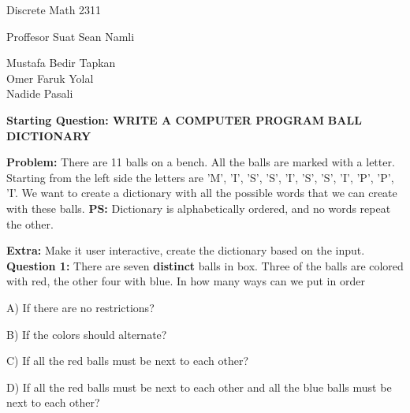 \documentclass[11pt]{article}
\begin{document}
\begin{center}
Discrete Math 2311
\end{center}

\begin{center}
Proffesor Suat Sean Namli\\
\end{center}

\begin{center}
Mustafa Bedir Tapkan\\
Omer Faruk Yolal\\
Nadide Pasali\\
\end{center}

\newpage

\textbf{Starting Question: WRITE A COMPUTER PROGRAM} 
\textbf{BALL DICTIONARY}

\textbf{Problem:} There are 11 balls on a bench. All the balls are marked with a letter. 
Starting from the left side the letters are 'M', 'I', 'S', 'S', 'I', 'S', 'S', 'I', 'P', 'P', 'I'. We want to 
create a dictionary with all the possible words that we can create with these balls. %
 \textbf{PS:} Dictionary is alphabetically ordered, and no words repeat the other. %

\textbf{Extra:} Make it user interactive, create the dictionary based on the input.
\\

\textbf{Question 1:} There are seven \textbf{distinct} balls in box. Three of the balls are colored with red, the other four with blue. In how many ways can we put in order 

A) If there are no restrictions?

B) If the colors should alternate?

C) If all the red balls must be next to each other?

D) If all the red balls must be next to each other and all the blue balls must be next to each other?
\\
\end{document}
